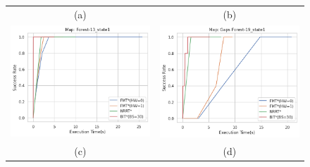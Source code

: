\documentclass{article}
\begin{document}
\begin{figure}[H]
{\begin{tabular}{cc}
			(a) & (b)  \\[6pt]
			\includegraphics[scale=0.45]{srVet_Forest-13_state1.png} & \includegraphics[scale=0.45]{srVet_Gaps Forest-19_state1.png}    \\
			(c) & (d) \\[6pt]

\end{tabular}}
\end{figure}
\end{document}
